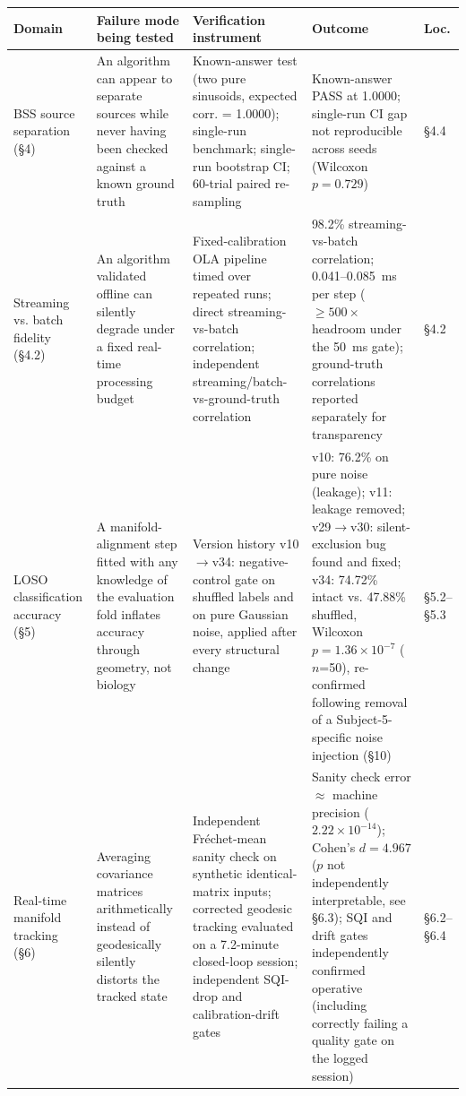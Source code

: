 \documentclass[11pt]{article}
\begin{document}
{\small
\begin{longtable}{p{}p{}p{}p{}p{}}
\toprule
Domain & Failure mode being tested & Verification instrument & Outcome & Loc. \\
\midrule
\endhead
BSS source separation (\S4) & An algorithm can appear to separate sources while never having been checked against a known ground truth & Known-answer test (two pure sinusoids, expected corr. = 1.0000); single-run benchmark; single-run bootstrap CI; 60-trial paired re-sampling & Known-answer PASS at 1.0000; single-run CI gap not reproducible across seeds (Wilcoxon $p = 0.729$) & \S4.4 \\
Streaming vs. batch fidelity (\S4.2) & An algorithm validated offline can silently degrade under a fixed real-time processing budget & Fixed-calibration OLA pipeline timed over repeated runs; direct streaming-vs-batch correlation; independent streaming/batch-vs-ground-truth correlation & 98.2\% streaming-vs-batch correlation; 0.041--0.085~ms per step ($\geq 500\times$ headroom under the 50~ms gate); ground-truth correlations reported separately for transparency & \S4.2 \\
LOSO classification accuracy (\S5) & A manifold-alignment step fitted with any knowledge of the evaluation fold inflates accuracy through geometry, not biology & Version history v10$\to$v34: negative-control gate on shuffled labels and on pure Gaussian noise, applied after every structural change & v10: 76.2\% on pure noise (leakage); v11: leakage removed; v29$\to$v30: silent-exclusion bug found and fixed; v34: 74.72\% intact vs. 47.88\% shuffled, Wilcoxon $p = 1.36\times10^{-7}$ ($n$=50), re-confirmed following removal of a Subject-5-specific noise injection (\S10) & \S5.2--\S5.3 \\
Real-time manifold tracking (\S6) & Averaging covariance matrices arithmetically instead of geodesically silently distorts the tracked state & Independent Fr\'echet-mean sanity check on synthetic identical-matrix inputs; corrected geodesic tracking evaluated on a 7.2-minute closed-loop session; independent SQI-drop and calibration-drift gates & Sanity check error $\approx$ machine precision ($2.22 \times 10^{-14}$); Cohen's $d = 4.967$ ($p$ not independently interpretable, see \S6.3); SQI and drift gates independently confirmed operative (including correctly failing a quality gate on the logged session) & \S6.2--\S6.4 \\

\end{longtable}}
\end{document}
